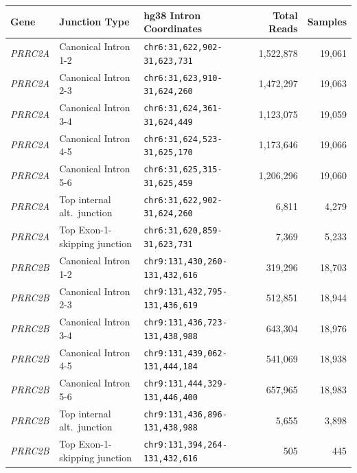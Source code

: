 \documentclass[10pt,letterpaper]{article}
\newcommand{\gene}[1]{\textit{#1}}
\begin{document}
\vspace{6pt}
\vspace{3pt}
{\scriptsize\setlength{\tabcolsep}{4.0pt}\renewcommand{\arraystretch}{1.08}
\begin{longtable}{@{}lllrr@{}}
\toprule
\textbf{Gene} & \textbf{Junction Type} & \textbf{hg38 Intron Coordinates} & \textbf{Total Reads} & \textbf{Samples} \\
\midrule
\endhead
\bottomrule
\endfoot
\gene{PRRC2A} & Canonical Intron 1-2 & \texttt{chr6:31,622,902-31,623,731} & 1,522,878 & 19,061 \\
\gene{PRRC2A} & Canonical Intron 2-3 & \texttt{chr6:31,623,910-31,624,260} & 1,472,297 & 19,063 \\
\gene{PRRC2A} & Canonical Intron 3-4 & \texttt{chr6:31,624,361-31,624,449} & 1,123,075 & 19,059 \\
\gene{PRRC2A} & Canonical Intron 4-5 & \texttt{chr6:31,624,523-31,625,170} & 1,173,646 & 19,066 \\
\gene{PRRC2A} & Canonical Intron 5-6 & \texttt{chr6:31,625,315-31,625,459} & 1,206,296 & 19,060 \\
\gene{PRRC2A} & Top internal alt.\ junction & \texttt{chr6:31,622,902-31,624,260} & 6,811 & 4,279 \\
\gene{PRRC2A} & Top Exon-1-skipping junction & \texttt{chr6:31,620,859-31,623,731} & 7,369 & 5,233 \\
\gene{PRRC2B} & Canonical Intron 1-2 & \texttt{chr9:131,430,260-131,432,616} & 319,296 & 18,703 \\
\gene{PRRC2B} & Canonical Intron 2-3 & \texttt{chr9:131,432,795-131,436,619} & 512,851 & 18,944 \\
\gene{PRRC2B} & Canonical Intron 3-4 & \texttt{chr9:131,436,723-131,438,988} & 643,304 & 18,976 \\
\gene{PRRC2B} & Canonical Intron 4-5 & \texttt{chr9:131,439,062-131,444,184} & 541,069 & 18,938 \\
\gene{PRRC2B} & Canonical Intron 5-6 & \texttt{chr9:131,444,329-131,446,400} & 657,965 & 18,983 \\
\gene{PRRC2B} & Top internal alt.\ junction & \texttt{chr9:131,436,896-131,438,988} & 5,655 & 3,898 \\
\gene{PRRC2B} & Top Exon-1-skipping junction & \texttt{chr9:131,394,264-131,432,616} & 505 & 445 \\
\end{longtable}
}
\end{document}
